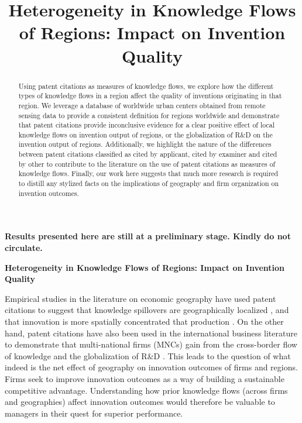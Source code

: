 \documentclass[12pt,letterpaper]{article}
\begin{document}
\setlength{\droptitle}{-5em}
\title{\textbf{\large Heterogeneity in Knowledge Flows of Regions: Impact on Invention Quality}}
\date{\vspace{-12ex}}

\maketitle
\thispagestyle{empty}
\renewcommand{\abstractname}{\normalsize ABSTRACT}
\begin{abstract}
\normalsize
\noindent Using patent citations as measures of knowledge flows, we explore how the different types of knowledge flows in a region affect the quality of inventions originating in that region. We leverage a database of worldwide urban centers  obtained from remote sensing data to provide a consistent definition for regions worldwide and demonstrate that patent citations provide inconclusive evidence for a clear positive effect of local knowledge flows on invention output of regions, or the globalization of R\&D on the invention output of regions. Additionally, we highlight the nature of the differences between patent citations classified as cited by applicant, cited by examiner and cited by other to contribute to the literature on the use of patent citations as measures of knowledge flows. Finally, our work here suggests that much more research is required to distill any stylized facts on the implications of geography and firm organization on invention outcomes. 
\end{abstract}
\vspace{30ex}
\textbf{Results presented here are still at a preliminary stage. Kindly do not circulate.}
\newpage
\pagestyle{fancy}
\fancyhf{}
\rhead{\thepage}

\textbf{Heterogeneity in Knowledge Flows of Regions: Impact on Invention Quality}

\vspace{3ex}


\noindent Empirical studies in the literature on economic geography have used patent citations to suggest that knowledge spillovers are geographically localized \citep*{Jaffe1993, Almeida1999, Branstetter2001, Sonn2008}, and that innovation is more spatially concentrated that production \citep{Feldman1994a}. On the other hand, patent citations have also been used in the international business literature to demonstrate that multi-national firms (MNCs) gain from the cross-border flow of knowledge and the globalization of R\&D \citep{Singh2007, Zhao2006, Singh2013}. This leads to the question of what indeed is the net effect of geography on innovation outcomes of firms and regions. Firms seek to improve innovation outcomes as a way of building a sustainable competitive advantage. Understanding how prior knowledge flows (across firms and geographies) affect innovation outcomes would therefore be valuable to managers in their quest for superior performance. \par
\end{document}
